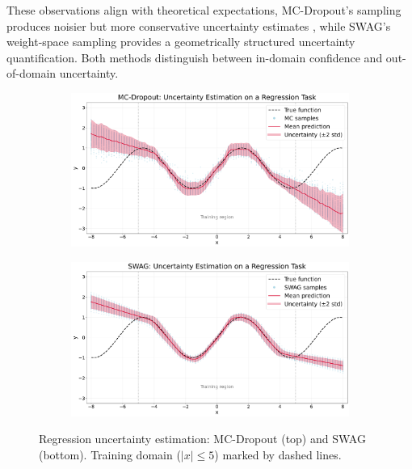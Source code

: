 \vspace{0.15cm}
These observations align with theoretical expectations, MC-Dropout's sampling produces noisier but more
conservative uncertainty estimates \citep{gal2016mcdropout}, while SWAG's weight-space sampling provides
a geometrically structured uncertainty quantification. Both methods distinguish between in-domain
confidence and out-of-domain uncertainty.

\FloatBarrier

\begin{figure}[ht]
  \centering
  \begin{subfigure}{0.8\textwidth}
    \centering
    \includegraphics[width=\textwidth]{plots/mcd_regression.png}
  \end{subfigure}
  
  \vspace{0.3cm}
  \begin{subfigure}{0.8\textwidth}
    \centering
    \includegraphics[width=\textwidth]{plots/swag_regression.png}
  \end{subfigure}
  \caption{Regression uncertainty estimation: MC-Dropout (top) and SWAG (bottom). Training domain ($|x| \leq 5$) marked by dashed lines.}
  \label{fig:regression}
\end{figure}

